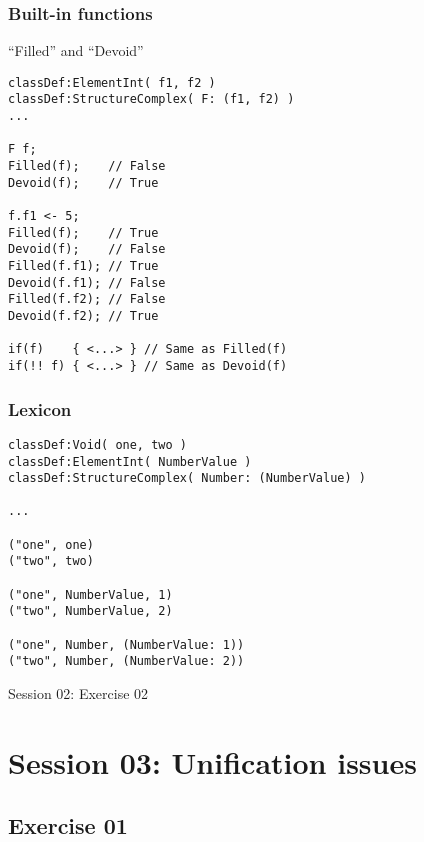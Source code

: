 \documentclass[11pt]{beamer}
\begin{document}
\begin{frame}[fragile]
\frametitle{Built-in functions}
\begin{block}{``Filled'' and ``Devoid''}
\scriptsize
\begin{lstlisting}[language=lekta]
classDef:ElementInt( f1, f2 )
classDef:StructureComplex( F: (f1, f2) )
...

F f;
Filled(f);    // False
Devoid(f);    // True

f.f1 <- 5;
Filled(f);    // True
Devoid(f);    // False
Filled(f.f1); // True
Devoid(f.f1); // False
Filled(f.f2); // False
Devoid(f.f2); // True

if(f)    { <...> } // Same as Filled(f)
if(!! f) { <...> } // Same as Devoid(f)
\end{lstlisting}
\end{block}
\end{frame}
\footnotesize
\begin{frame}[fragile]
\frametitle{Lexicon}
\begin{lstlisting}[language=lekta]
classDef:Void( one, two )
classDef:ElementInt( NumberValue )
classDef:StructureComplex( Number: (NumberValue) )

...

("one", one)
("two", two)

("one", NumberValue, 1)
("two", NumberValue, 2)

("one", Number, (NumberValue: 1))
("two", Number, (NumberValue: 2))
\end{lstlisting}
\end{frame}

\begin{frame}[fragile]
\Huge
\begin{center}
Session 02: Exercise 02
\end{center}
\end{frame}

\section{Session 03: Unification issues}

\subsection{Exercise 01}
\end{document}
